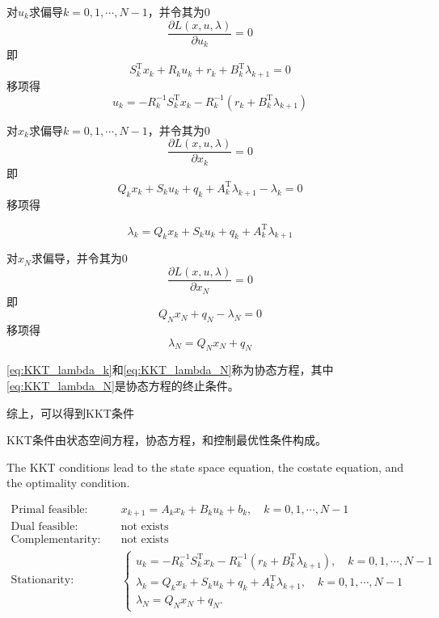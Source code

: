 \documentclass[withoutpreface,bwprint]{NoteBook}
\begin{document}
对$u_k$求偏导$k=0,1,\cdots,N-1$，并令其为0
$$
\frac{\partial L(x,u,\lambda)}{\partial u_k} = 0
$$
即
$$
S_k^\mathrm{T}x_k + R_k u_k + r_k + B_k^\mathrm{T}\lambda_{k+1}=0
$$
移项得
\begin{equation}
\label{eq:KKT_u_k}
u_k = -R_k^{-1}S_k^\mathrm{T}x_k - R_k^{-1}\left( r_k + B_k^\mathrm{T}\lambda_{k+1} \right)
\end{equation}

对$x_k$求偏导$k=0,1,\cdots,N-1$，并令其为0
$$
\frac{\partial L(x,u,\lambda)}{\partial x_k} = 0
$$
即
$$
Q_k x_k + S_k u_k +q_k + A_k^\mathrm{T}\lambda_{k+1}-\lambda_{k}=0
$$
移项得

\begin{equation}
\label{eq:KKT_lambda_k}
\lambda_{k}=Q_k x_k + S_k u_k +q_k + A_k^\mathrm{T}\lambda_{k+1}
\end{equation}

对$x_N$​求偏导，并令其为0
$$
\frac{\partial L(x,u,\lambda)}{\partial x_N} = 0
$$
即
$$
Q_N x_N+ q_N -\lambda_N =0
$$
移项得
\begin{equation}
\label{eq:KKT_lambda_N}
\lambda_N =Q_N x_N+ q_N
\end{equation}

\cref{eq:KKT_lambda_k}和\cref{eq:KKT_lambda_N}称为协态方程，其中\cref{eq:KKT_lambda_N}是协态方程的终止条件。



综上，可以得到KKT条件

KKT条件由状态空间方程，协态方程，和控制最优性条件构成。

The KKT conditions lead to the state space equation, the costate equation, and the optimality condition.


\begin{align}
\text{Primal feasible:}& \quad
x_{k+1} = A_k x_k + B_k u_k + b_k, \quad k=0,1,\cdots,N-1\\

\text{Dual feasible:}& \quad \text{not exists} \nonumber \\

\text{Complementarity:}& \quad \text{not exists} \nonumber \\

\text{Stationarity:}& \quad
\begin{cases}
u_k = -R_k^{-1}S_k^\mathrm{T}x_k - R_k^{-1}\left( r_k + B_k^\mathrm{T}\lambda_{k+1} \right),
\quad k=0,1,\cdots,N-1\\

\lambda_{k}=Q_k x_k + S_k u_k +q_k + A_k^\mathrm{T}\lambda_{k+1}, \quad k=0,1,\cdots,N-1 \\

\lambda_N =Q_N x_N+ q_N.
\end{cases}
\end{align}
\end{document}
